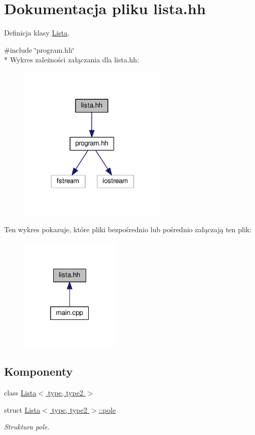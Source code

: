 \hypertarget{lista_8hh}{\section{Dokumentacja pliku lista.\-hh}
\label{lista_8hh}
}


Definicja klasy \hyperlink{class_lista}{Lista}.  


{\ttfamily \#include \char`\"{}program.\-hh\char`\"{}}\\*
Wykres zależności załączania dla lista.\-hh\-:\nopagebreak
\begin{figure}[H]
\begin{center}
\leavevmode
\includegraphics[width=202pt]{lista_8hh__incl}
\end{center}
\end{figure}
Ten wykres pokazuje, które pliki bezpośrednio lub pośrednio załączają ten plik\-:\nopagebreak
\begin{figure}[H]
\begin{center}
\leavevmode
\includegraphics[width=134pt]{lista_8hh__dep__incl}
\end{center}
\end{figure}
\subsection*{Komponenty}
\begin{DoxyCompactItemize}
\item 
class \hyperlink{class_lista}{Lista$<$ type, type2 $>$}
\item 
struct \hyperlink{struct_lista_1_1pole}{Lista$<$ type, type2 $>$\-::pole}
\begin{DoxyCompactList}\small\item\em Struktura pole. \end{DoxyCompactList}\end{DoxyCompactItemize}
